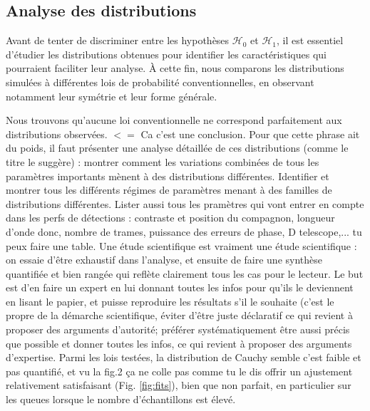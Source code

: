 \documentclass{article}
\newcommand{\dm}[1]{{\color{mulberry} #1}}
\begin{document}
\subsection{Analyse des distributions}  \label{sec:distribution_analysis}

Avant de tenter de discriminer entre les hypothèses $\mathcal{H}_0$ et $\mathcal{H}_1$, il est essentiel d'étudier les distributions obtenues pour identifier les caractéristiques qui pourraient faciliter leur analyse. À cette fin, nous comparons les distributions simulées à différentes lois de probabilité conventionnelles, en observant notamment leur symétrie et leur forme générale.

Nous trouvons qu'aucune loi conventionnelle ne correspond parfaitement aux distributions observées. \dm{$<=$ Ca c'est une conclusion. Pour que cette phrase ait du poids, il faut présenter une analyse détaillée de ces distributions (comme le titre le suggère) : montrer comment les variations combinées de tous les paramètres importants mènent à des distributions différentes. Identifier et montrer tous les différents régimes de paramètres menant à des familles de distributions différentes. Lister aussi tous les pramètres qui vont entrer en compte dans les perfs de détections : contraste et position du compagnon, longueur d'onde donc, nombre de trames, puissance des erreurs de phase, D telescope,... tu peux faire une table. Une étude scientifique est vraiment une étude scientifique : on essaie d'être exhaustif dans l'analyse, et ensuite de faire une synthèse quantifiée et bien rangée qui reflète clairement tous les cas pour le lecteur. Le but est d'en faire un expert en lui donnant toutes les infos pour qu'ils le deviennent en lisant le papier, et puisse reproduire les résultats s'il le souhaite (c'est le propre de la démarche scientifique, éviter d'être juste déclaratif ce qui revient à proposer des arguments d'autorité; préférer systématiquement être aussi précis que possible et donner toutes les infos, ce qui revient à proposer des arguments d'expertise.} Parmi les lois testées, la distribution de Cauchy semble \dm{c'est faible et pas quantifié, et vu la fig.2 ça ne colle pas comme tu le dis} offrir un ajustement relativement satisfaisant (Fig. \ref{fig:fits}), bien que non parfait, en particulier sur les queues lorsque le nombre d'échantillons est élevé.
\end{document}
